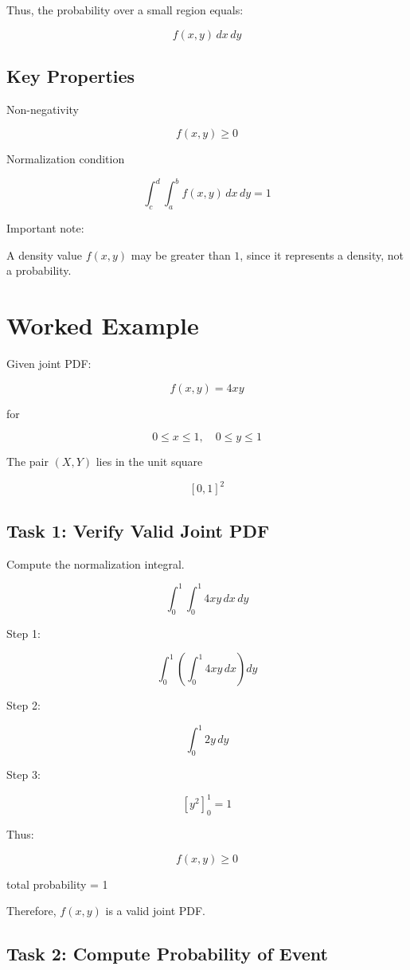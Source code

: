 \documentclass{article}
\begin{document}
Thus, the probability over a small region equals:

\[
f(x,y)\,dx\,dy
\]

\subsection{Key Properties}

Non-negativity

\[
f(x,y)\ge0
\]

Normalization condition

\[
\int_c^d\int_a^b f(x,y)\,dx\,dy = 1
\]

Important note:

A density value $f(x,y)$ may be greater than $1$, since it represents a density, not a probability.

\section{Worked Example}

Given joint PDF:

\[
f(x,y)=4xy
\]

for

\[
0\le x\le1,\quad 0\le y\le1
\]

The pair $(X,Y)$ lies in the unit square

\[
[0,1]^2
\]

\subsection*{Task 1: Verify Valid Joint PDF}

Compute the normalization integral.

\[
\int_0^1\int_0^1 4xy\,dx\,dy
\]

Step 1:

\[
\int_0^1 \left(\int_0^1 4xy\,dx\right)dy
\]

Step 2:

\[
\int_0^1 2y\,dy
\]

Step 3:

\[
[y^2]_0^1 = 1
\]

Thus:

\[
f(x,y)\ge0
\]

total probability = 1

Therefore, $f(x,y)$ is a valid joint PDF.

\subsection*{Task 2: Compute Probability of Event}
\end{document}
